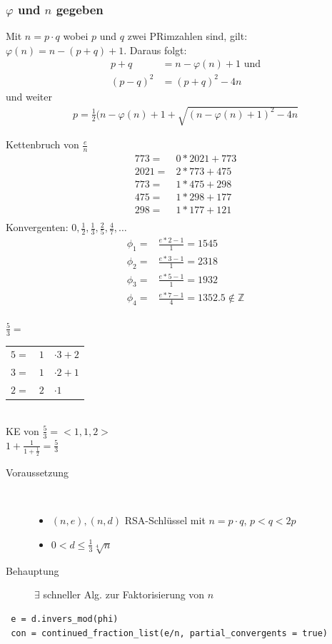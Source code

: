 \documentclass[landscape,twocolumn,a4paper]{article}
\newcommand{\T}[1]{\text{#1}} %
\newcommand{\Oneover}[1]{\frac{1}{#1}} %
\begin{document}
\subsubsection{$\varphi$ und $n$ gegeben}
Mit $n=p\cdot q$ wobei $p$ und $q$ zwei PRimzahlen sind, gilt: $\varphi(n)=n-(p+q)+1$. Daraus folgt:
\begin{align*}
 p+q&=n-\varphi(n)+1 \T{ und}\\
 (p-q)^2&=(p+q)^2-4n
\end{align*}
und weiter
\begin{align*}
 p=\Oneover{2}(n-\varphi(n)+1+\sqrt{(n-\varphi(n)+1)^2-4n}
\end{align*}

\begin{multicols}{2}
Kettenbruch von $\frac{e}{n}$\\
\begin{align*}
773 =& 0 * 2021 + 773 \\
2021 =& 2*773 + 475 \\
773 =& 1*475 + 298 \\
475 =& 1*298 + 177 \\
298 =& 1*177 + 121 \\
\end{align*}
Konvergenten: $0, \frac{1}{2}, \frac{1}{3}, \frac{2}{5}, \frac{4}{7}, \ldots$
\begin{align*}
\phi_1 =& \frac{e*2-1}{1} = 1545\\
\phi_2 =& \frac{e*3-1}{1} = 2318\\
\phi_3 =& \frac{e*5-1}{1} = 1932\\
\phi_4 =& \frac{e*7-1}{4} = 1352.5 \notin \mathbb{Z}\\
\end{align*}
\end{multicols}
$\frac{5}{3}=$\\
\begin{tabular}{l|c|l}\cline{2-1}
 $5=$&$1$&$\cdot3+2$\\
 $3=$&$1$&$\cdot2+1$\\
 $2=$&$2$&$\cdot1$\\\cline{2-1}
\end{tabular}\\\linebreak
{\color{red}KE von $\frac{5}{3}=<1,1,2>$}\\
$1+\frac{1}{1+\frac{1}{2}}=\frac{5}{3}$\\
\begin{description}
 \item [Voraussetzung] \hfill \\
    \begin{itemize}
      \item $(n,e),(n,d)$ RSA-Schlüssel mit $n=p\cdot q$, $p<q<2p$
      \item $0<d\leqslant\Oneover{3}\sqrt[4]{n}$
    \end{itemize}
 \item [Behauptung] $\exists$ schneller Alg. zur Faktorisierung von $n$
\end{description}
\begin{lstlisting}
 e = d.invers_mod(phi)
 con = continued_fraction_list(e/n, partial_convergents = true)
\end{lstlisting}
\end{document}
